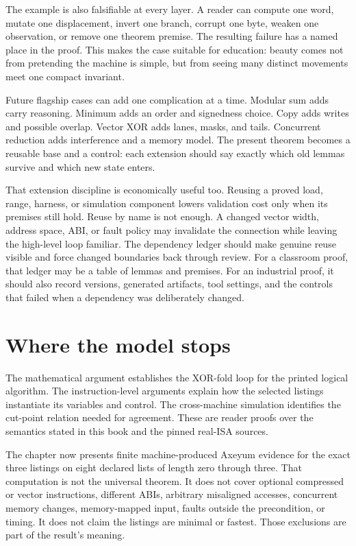 The example is also falsifiable at every layer. A reader can compute one word,
mutate one displacement, invert one branch, corrupt one byte, weaken one
observation, or remove one theorem premise. The resulting failure has a named
place in the proof. This makes the case suitable for education: beauty comes
not from pretending the machine is simple, but from seeing many distinct
movements meet one compact invariant.

Future flagship cases can add one complication at a time. Modular sum adds
carry reasoning. Minimum adds an order and signedness choice. Copy adds writes
and possible overlap. Vector XOR adds lanes, masks, and tails. Concurrent
reduction adds interference and a memory model. The present theorem becomes a
reusable base and a control: each extension should say exactly which old
lemmas survive and which new state enters.

That extension discipline is economically useful too. Reusing a proved load,
range, harness, or simulation component lowers validation cost only when its
premises still hold. Reuse by name is not enough. A changed vector width,
address space, ABI, or fault policy may invalidate the connection while leaving
the high-level loop familiar. The dependency ledger should make genuine reuse
visible and force changed boundaries back through review. For a classroom
proof, that ledger may be a table of lemmas and premises. For an industrial
proof, it should also record versions, generated artifacts, tool settings, and
the controls that failed when a dependency was deliberately changed.

\section{Where the model stops}

The mathematical argument establishes the XOR-fold loop for the printed
logical algorithm. The instruction-level arguments explain how the selected
listings instantiate its variables and control. The cross-machine simulation
identifies the cut-point relation needed for agreement. These are reader
proofs over the semantics stated in this book and the pinned real-ISA sources.

The chapter now presents finite machine-produced Axeyum evidence for the exact
three listings on eight declared lists of length zero through three. That
computation is not the universal theorem. It does not cover optional compressed or vector instructions,
different ABIs, arbitrary misaligned accesses, concurrent memory changes,
memory-mapped input, faults outside the precondition, or timing. It does not
claim the listings are minimal or fastest. Those exclusions are part of the
result's meaning.

